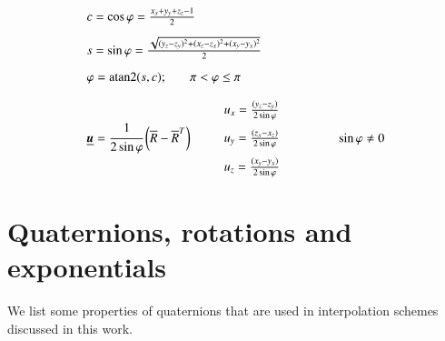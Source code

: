 \begin{equation}
    \begin{array}{l}
        c=\cos\varphi=\frac{x_{x}+y_{y}+z_{z}-1}{2}\\[2ex] s=\sin\varphi=\frac{\sqrt{(y_{z}-z_{y})^2+(x_{z}-z_{x})^2+(x_{y}-y_{x})^2}}{2}\\[2ex]
        \varphi=\operatorname{atan2}(s,c); \hspace{4ex} \pi < \varphi \leq \pi\\
        \ \\
        \underline{{\boldsymbol{u}}}=\cfrac{1}{2\sin\varphi} \left(\overline{R}-\overline{R}^T\right)
        \qquad
        \begin{array}{l}
          u_x=\frac{(y_{z}-z_{y})}{2\sin \varphi} \\[2ex]
          u_y=\frac{(z_{x}-x_{z})}{2\sin \varphi} \\[2ex]
          u_z=\frac{(x_{y}-y_{x})}{2\sin \varphi}
        \end{array}
        \qquad\qquad
        \sin\varphi\ne 0
    \end{array}
    \label{eq:extract}
\end{equation}

\section{Quaternions, rotations and exponentials}
\label{app:Quaternion}

We list some properties of quaternions that are used in interpolation schemes discussed in this work. 

